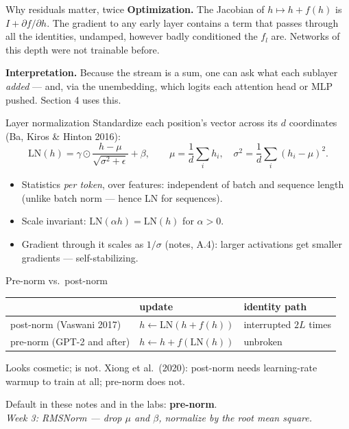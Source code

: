 \documentclass[11pt,aspectratio=169]{beamer}
\newcommand{\LN}{\mathrm{LN}}
\newcommand{\dest}[1]{\textcolor{structure}{\textbf{#1}}}
\newcommand{\hook}[1]{{\small\textcolor{gray!60!black}{\textit{#1}}}}
\begin{document}
\begin{frame}{Why residuals matter, twice}
  \textbf{Optimization.} The Jacobian of $h\mapsto h + f(h)$ is $I + \partial f/\partial h$.
  The gradient to any early layer contains a term that passes through all the identities,
  undamped, however badly conditioned the $f_l$ are. Networks of this depth were not
  trainable before.

  \vspace{1em}
  \textbf{Interpretation.} Because the stream is a sum, one can ask what each sublayer
  \emph{added} --- and, via the unembedding, which logits each attention head or MLP pushed.
  Section 4 uses this.
\end{frame}

\begin{frame}{Layer normalization}
  Standardize each position's vector across its $d$ coordinates (Ba, Kiros \& Hinton 2016):
  \[
    \LN(h) = \gamma\odot\frac{h - \mu}{\sqrt{\sigma^2 + \epsilon}} + \beta,\qquad
    \mu = \frac1d\sum_i h_i,\quad \sigma^2 = \frac1d\sum_i(h_i - \mu)^2 .
  \]

  \vspace{0.6em}
  \begin{itemize}
    \item Statistics \emph{per token}, over features: independent of batch and sequence
          length (unlike batch norm --- hence LN for sequences).
    \item Scale invariant: $\LN(\alpha h) = \LN(h)$ for $\alpha > 0$.
    \item Gradient through it scales as $1/\sigma$ (notes, A.4): larger activations get
          smaller gradients --- self-stabilizing.
  \end{itemize}
\end{frame}

\begin{frame}{Pre-norm vs.\ post-norm}
  \begin{center}
  \begin{tabular}{@{}lll@{}}
    \toprule
    & update & identity path \\
    \midrule
    post-norm (Vaswani 2017) & $h\leftarrow\LN(h + f(h))$ & interrupted $2L$ times \\
    pre-norm (GPT-2 and after) & $h\leftarrow h + f(\LN(h))$ & unbroken \\
    \bottomrule
  \end{tabular}
  \end{center}

  \vspace{1em}
  Looks cosmetic; is not. Xiong et al.\ (2020): post-norm needs learning-rate warmup to
  train at all; pre-norm does not.

  \vspace{0.8em}
  Default in these notes and in the labs: \dest{pre-norm}.\\
  \hook{Week 3: RMSNorm --- drop $\mu$ and $\beta$, normalize by the root mean square.}
\end{frame}
\end{document}
